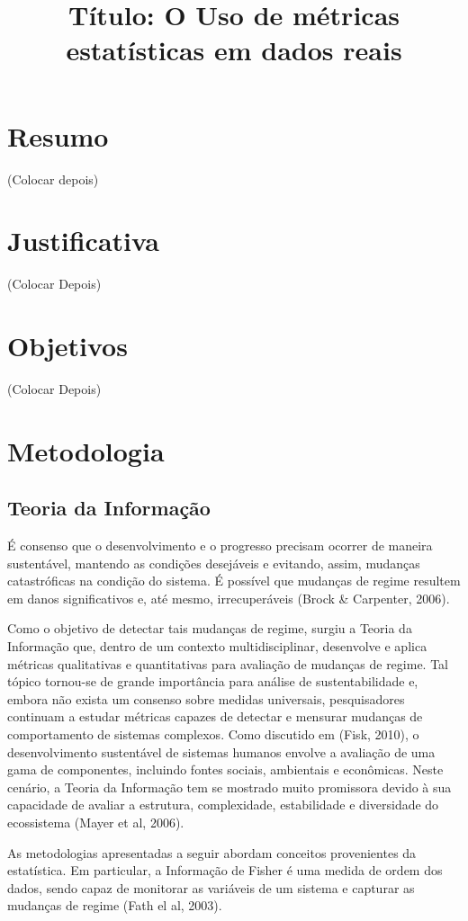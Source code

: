 \documentclass{article}[12pt]
\title{\textbf{Título: O Uso de métricas estatísticas em dados reais}}
\date{}
\author{}
\begin{document}
\maketitle
\section*{Resumo}
(Colocar depois)
\section{Justificativa}
(Colocar Depois)

\section{\textbf{Objetivos}}
(Colocar Depois)

\section{\textbf{Metodologia}}

\subsection{Teoria da Informação}

É consenso que o desenvolvimento e o progresso precisam ocorrer de maneira sustentável, mantendo as condições desejáveis e evitando, assim, mudanças catastróficas na condição do sistema.
É possível que mudanças de regime resultem em danos significativos e, até mesmo, irrecuperáveis (Brock \& Carpenter, 2006). 

Como o objetivo de detectar tais mudanças de regime, surgiu a Teoria da Informação que, dentro de um contexto multidisciplinar, desenvolve e aplica métricas qualitativas e quantitativas para avaliação de mudanças de regime. Tal tópico tornou-se de grande importância para análise de sustentabilidade e, embora não exista um consenso sobre medidas universais, pesquisadores continuam a estudar métricas capazes de detectar e mensurar mudanças de comportamento de sistemas complexos.  Como discutido em (Fisk, 2010), o desenvolvimento sustentável de sistemas humanos envolve a avaliação de uma gama de componentes, incluindo fontes sociais, ambientais e econômicas. Neste cenário, a Teoria da Informação tem se mostrado muito promissora devido à sua capacidade de avaliar a estrutura, complexidade, estabilidade e diversidade do ecossistema (Mayer et al, 2006). 

As metodologias apresentadas a seguir abordam conceitos provenientes da estatística. Em particular, a Informação de Fisher é uma medida de ordem dos dados, sendo capaz de monitorar as variáveis de um sistema e capturar as mudanças de regime (Fath el al, 2003). 
\end{document}

